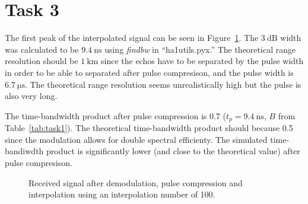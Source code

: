 \documentclass[12pt,a4paper]{article}
\begin{document}
\section{Task 3}\label{sec:3}
The first peak of the interpolated signal can be seen in Figure~\ref{fig:task3}. The $\SI{3}{\deci\bel}$ width was calculated to be $\SI{9.4}{\nano\second}$ using \textit{findbw} in ``ha1utils.pyx.''
The theoretical range resolution should be $\SI{1}{\kilo\metre}$ since the echos have to be separated by the pulse width in order to be able to separated after pulse compresison, and the pulse width is $\SI{6.7}{\micro\second}$.
The theoretical range resolution seems unrealistically high but the pulse is also very long.

The time-bandwidth product after pulse compression is 0.7 ($t_p=\SI{9.4}{\nano\second}$, $B$ from Table~\ref{tab:task1}). The theoretical time-bandwidth product should because 0.5 since the modulation allows for double spectral efficienty. The simulated time-bandiwdth product is significantly lower (and close to the theoretical value) after pulse compresison.
\begin{figure}[h]
  \centering
  \noindent\makebox[\textwidth]{\scalebox{0.90}{}}
  \caption{Received signal after demodulation, pulse compression and interpolation using an interpolation number of 100.}
  \label{fig:task3}
\end{figure}
\end{document}
